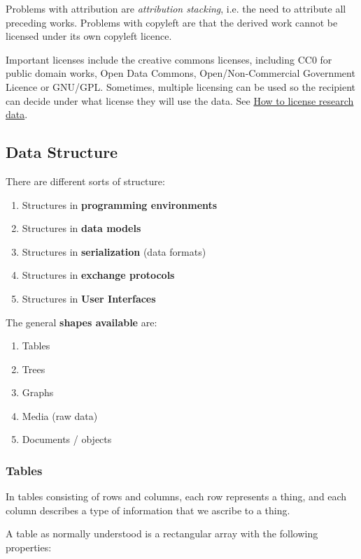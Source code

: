 Problems with attribution are \textit{attribution stacking}, i.e. the need to attribute all preceding works. Problems with copyleft are that the derived work cannot be licensed under its own copyleft licence.

Important licenses include the creative commons licenses, including CC0 for public domain works, Open Data Commons, Open/Non-Commercial Government Licence or GNU/GPL. Sometimes, multiple licensing can be used so the recipient can decide under what license they will use the data. See \href{https://www.dcc.ac.uk/guidance/how-guides/license-research-data#x1-8000}{How to license research data}.


\subsection{Data Structure}

There are different sorts of structure:

\begin{enumerate}
    \item Structures in \textbf{programming environments}
    \item Structures in \textbf{data models}
    \item Structures in \textbf{serialization} (data formats)
    \item Structures in \textbf{exchange protocols}
    \item Structures in \textbf{User Interfaces}
\end{enumerate}

The general \textbf{shapes available} are:

\begin{enumerate}
    \item Tables
    \item Trees
    \item Graphs
    \item Media (raw data)
    \item Documents / objects
\end{enumerate}

\subsubsection{Tables}

In tables consisting of rows and columns, each row represents a thing, and each column describes a type of information that we ascribe to a thing. 

A table as normally understood is a rectangular array with the following properties:

